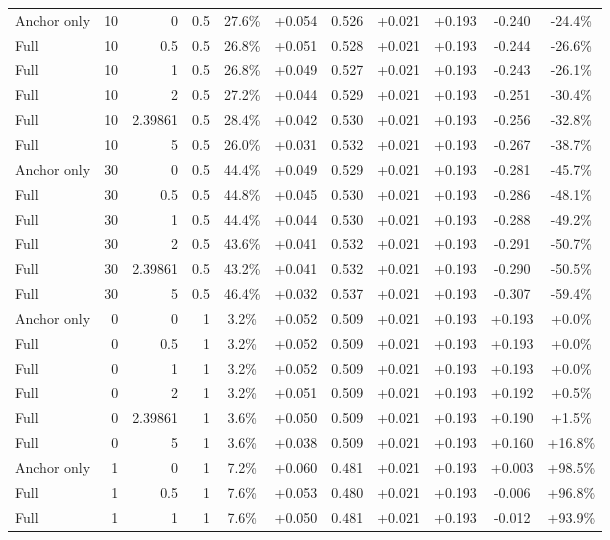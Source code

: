 \begin{table}[htbp]
\begin{tabular}{lrrrccccccc}
Anchor only & 10 & 0 & 0.5 & 27.6\% & +0.054 & 0.526 & +0.021 & +0.193 & -0.240 & -24.4\% \\
Full & 10 & 0.5 & 0.5 & 26.8\% & +0.051 & 0.528 & +0.021 & +0.193 & -0.244 & -26.6\% \\
Full & 10 & 1 & 0.5 & 26.8\% & +0.049 & 0.527 & +0.021 & +0.193 & -0.243 & -26.1\% \\
Full & 10 & 2 & 0.5 & 27.2\% & +0.044 & 0.529 & +0.021 & +0.193 & -0.251 & -30.4\% \\
Full & 10 & 2.39861 & 0.5 & 28.4\% & +0.042 & 0.530 & +0.021 & +0.193 & -0.256 & -32.8\% \\
Full & 10 & 5 & 0.5 & 26.0\% & +0.031 & 0.532 & +0.021 & +0.193 & -0.267 & -38.7\% \\
Anchor only & 30 & 0 & 0.5 & 44.4\% & +0.049 & 0.529 & +0.021 & +0.193 & -0.281 & -45.7\% \\
Full & 30 & 0.5 & 0.5 & 44.8\% & +0.045 & 0.530 & +0.021 & +0.193 & -0.286 & -48.1\% \\
Full & 30 & 1 & 0.5 & 44.4\% & +0.044 & 0.530 & +0.021 & +0.193 & -0.288 & -49.2\% \\
Full & 30 & 2 & 0.5 & 43.6\% & +0.041 & 0.532 & +0.021 & +0.193 & -0.291 & -50.7\% \\
Full & 30 & 2.39861 & 0.5 & 43.2\% & +0.041 & 0.532 & +0.021 & +0.193 & -0.290 & -50.5\% \\
Full & 30 & 5 & 0.5 & 46.4\% & +0.032 & 0.537 & +0.021 & +0.193 & -0.307 & -59.4\% \\
Anchor only & 0 & 0 & 1 & 3.2\% & +0.052 & 0.509 & +0.021 & +0.193 & +0.193 & +0.0\% \\
Full & 0 & 0.5 & 1 & 3.2\% & +0.052 & 0.509 & +0.021 & +0.193 & +0.193 & +0.0\% \\
Full & 0 & 1 & 1 & 3.2\% & +0.052 & 0.509 & +0.021 & +0.193 & +0.193 & +0.0\% \\
Full & 0 & 2 & 1 & 3.2\% & +0.051 & 0.509 & +0.021 & +0.193 & +0.192 & +0.5\% \\
Full & 0 & 2.39861 & 1 & 3.6\% & +0.050 & 0.509 & +0.021 & +0.193 & +0.190 & +1.5\% \\
Full & 0 & 5 & 1 & 3.6\% & +0.038 & 0.509 & +0.021 & +0.193 & +0.160 & +16.8\% \\
Anchor only & 1 & 0 & 1 & 7.2\% & +0.060 & 0.481 & +0.021 & +0.193 & +0.003 & +98.5\% \\
Full & 1 & 0.5 & 1 & 7.6\% & +0.053 & 0.480 & +0.021 & +0.193 & -0.006 & +96.8\% \\
Full & 1 & 1 & 1 & 7.6\% & +0.050 & 0.481 & +0.021 & +0.193 & -0.012 & +93.9\% \\

\end{tabular}
\end{table}
